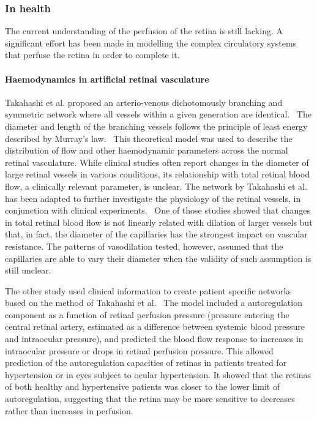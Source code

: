 \documentclass{article}
\begin{document}
\subsubsection*{In health}

The current understanding of the perfusion of the retina is still lacking.
A significant effort has been made in modelling the complex circulatory systems that perfuse the retina in order to complete it.

\paragraph*{Haemodynamics in artificial retinal vasculature}

Takahashi et al. proposed an arterio-venous dichotomously branching and symmetric network where all vessels within a given generation are identical.~\cite{Takahashi_2009}
The diameter and length of the branching vessels follows the principle of least energy described by Murray's law.~\cite{Murray_1926}
This theoretical model was used to describe the distribution of flow and other haemodynamic parameters across the normal retinal vasculature.
While clinical studies often report changes in the diameter of large retinal vessels in various conditions, its relationship with total retinal blood flow, a clinically relevant parameter, is unclear.
The network by Takahashi et al. has been adapted to further investigate the physiology of the retinal vessels, in conjunction with clinical experiments.~\cite{Aschinger_2017,Pappelis_2020}
One of those studies showed that changes in total retinal blood flow is not linearly related with dilation of larger vessels but that, in fact, the diameter of the capillaries has the strongest impact on vascular resistance.
The patterns of vasodilation tested, however, assumed that the capillaries are able to vary their diameter when the validity of such assumption is still unclear.~\cite{Kur_2012}

The other study used clinical information to create patient specific networks based on the method of Takahashi et al.~\cite{Pappelis_2020}
The model included a autoregulation component as a function of retinal perfusion pressure (pressure entering the central retinal artery, estimated as a difference between systemic blood pressure and intraocular pressure), and predicted the blood flow response to increases in intraocular pressure or drops in retinal perfusion pressure.
This allowed prediction of the autoregulation capacities of retinas in patients treated for hypertension or in eyes subject to ocular hypertension.
It showed that the retinas of both healthy and hypertensive patients was closer to the lower limit of autoregulation, suggesting that the retina may be more sensitive to decreases rather than increases in perfusion.~\cite{Pappelis_2020}
\end{document}
